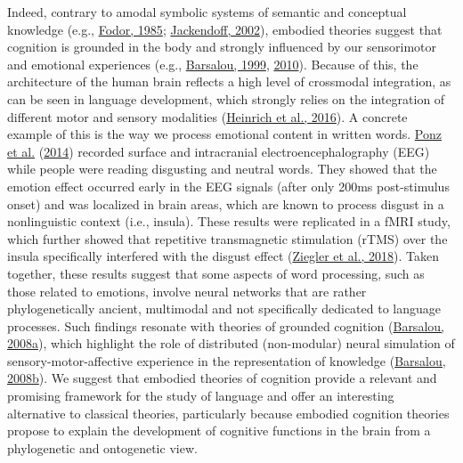 \documentclass[
  a4paper,12pt,twoside,onecolumn,openright,final,oldfontcommands]{memoir}
\begin{document}
Indeed, contrary to amodal symbolic systems of semantic and conceptual knowledge (e.g., \protect\hyperlink{ref-fodor_precis_1985}{Fodor, 1985}; \protect\hyperlink{ref-jackendoff_english_2002}{Jackendoff, 2002}), embodied theories suggest that cognition is grounded in the body and strongly influenced by our sensorimotor and emotional experiences (e.g., \protect\hyperlink{ref-barsalou_perceptual_1999}{Barsalou, 1999}, \protect\hyperlink{ref-barsalou_grounded_2010}{2010}). Because of this, the architecture of the human brain reflects a high level of crossmodal integration, as can be seen in language development, which strongly relies on the integration of different motor and sensory modalities (\protect\hyperlink{ref-heinrich_crossmodal_2016}{Heinrich et al., 2016}). A concrete example of this is the way we process emotional content in written words. \protect\hyperlink{ref-ponz_emotion_2014}{Ponz et al.} (\protect\hyperlink{ref-ponz_emotion_2014}{2014}) recorded surface and intracranial electroencephalography (EEG) while people were reading disgusting and neutral words. They showed that the emotion effect occurred early in the EEG signals (after only 200ms post-stimulus onset) and was localized in brain areas, which are known to process disgust in a nonlinguistic context (i.e., insula). These results were replicated in a fMRI study, which further showed that repetitive transmagnetic stimulation (rTMS) over the insula specifically interfered with the disgust effect (\protect\hyperlink{ref-ziegler_words_2018}{Ziegler et al., 2018}). Taken together, these results suggest that some aspects of word processing, such as those related to emotions, involve neural networks that are rather phylogenetically ancient, multimodal and not specifically dedicated to language processes. Such findings resonate with theories of grounded cognition (\protect\hyperlink{ref-barsalou_grounded_2008}{Barsalou, 2008a}), which highlight the role of distributed (non-modular) neural simulation of sensory-motor-affective experience in the representation of knowledge (\protect\hyperlink{ref-barsalou_cognitive_2008}{Barsalou, 2008b}). We suggest that embodied theories of cognition provide a relevant and promising framework for the study of language and offer an interesting alternative to classical theories, particularly because embodied cognition theories propose to explain the development of cognitive functions in the brain from a phylogenetic and ontogenetic view.
\end{document}
